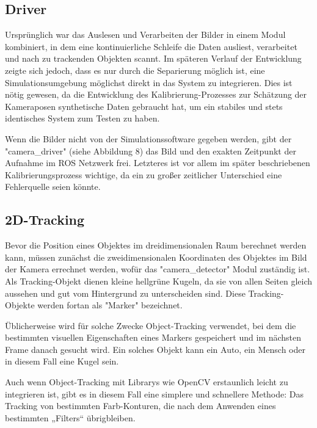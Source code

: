 \documentclass[12pt, ngerman]{article}
\begin{document}
\subsection{Driver}
Ursprünglich war das Auslesen und Verarbeiten der Bilder in einem Modul kombiniert, in dem eine kontinuierliche Schleife die Daten ausliest, verarbeitet und nach zu trackenden Objekten scannt. Im späteren Verlauf der Entwicklung zeigte sich jedoch, dass es nur durch die Separierung möglich ist, eine Simulationsumgebung möglichst direkt in das System zu integrieren. Dies ist nötig gewesen, da die Entwicklung des Kalibrierung-Prozesses zur Schätzung der Kameraposen synthetische Daten gebraucht hat, um ein stabiles und stets identisches System zum Testen zu haben. 

Wenn die Bilder nicht von der Simulationssoftware gegeben werden, gibt der "camera\_driver" (siehe Abbildung 8) das Bild und den exakten Zeitpunkt der Aufnahme im ROS Netzwerk frei. Letzteres ist vor allem im später beschriebenen Kalibrierungsprozess wichtige, da ein zu großer zeitlicher Unterschied eine Fehlerquelle seien könnte.

\subsection{2D-Tracking}
Bevor die Position eines Objektes im dreidimensionalen Raum berechnet werden kann, müssen zunächst die zweidimensionalen Koordinaten des Objektes im Bild der Kamera errechnet werden, wofür das "camera\_detector" Modul zuständig ist. Als Tracking-Objekt dienen kleine hellgrüne Kugeln, da sie von allen Seiten gleich aussehen und gut vom Hintergrund zu unterscheiden sind. Diese Tracking-Objekte werden fortan als "Marker" bezeichnet.  

Üblicherweise wird für solche Zwecke Object-Tracking verwendet, bei dem die bestimmten visuellen Eigenschaften eines Markers gespeichert und im nächsten Frame danach gesucht wird. Ein solches Objekt kann ein Auto, ein Mensch oder in diesem Fall eine Kugel sein.  

Auch wenn Object-Tracking mit Librarys wie OpenCV erstaunlich leicht zu integrieren ist, gibt es in diesem Fall eine simplere und schnellere Methode: Das Tracking von bestimmten Farb-Konturen, die nach dem Anwenden eines bestimmten „Filters“ übrigbleiben. 
\end{document}
